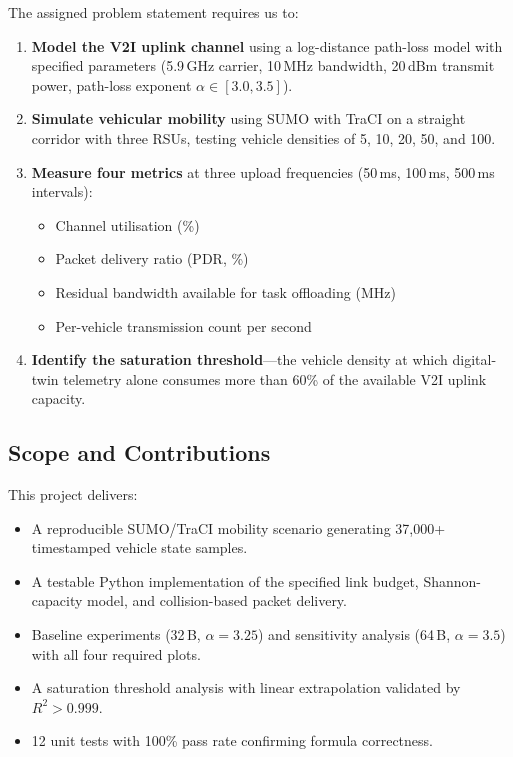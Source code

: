 \documentclass[12pt, a4paper]{article}
\begin{document}
The assigned problem statement requires us to:

\begin{enumerate}
    \item \textbf{Model the V2I uplink channel} using a log-distance path-loss
    model with specified parameters (5.9\,GHz carrier, 10\,MHz bandwidth,
    20\,dBm transmit power, path-loss exponent $\alpha \in [3.0, 3.5]$).

    \item \textbf{Simulate vehicular mobility} using SUMO with TraCI on a
    straight corridor with three RSUs, testing vehicle densities of 5, 10, 20,
    50, and 100.

    \item \textbf{Measure four metrics} at three upload frequencies
    (50\,ms, 100\,ms, 500\,ms intervals):
    \begin{itemize}
        \item Channel utilisation (\%)
        \item Packet delivery ratio (PDR, \%)
        \item Residual bandwidth available for task offloading (MHz)
        \item Per-vehicle transmission count per second
    \end{itemize}

    \item \textbf{Identify the saturation threshold}---the vehicle density at
    which digital-twin telemetry alone consumes more than 60\% of the available
    V2I uplink capacity.
\end{enumerate}

\subsection{Scope and Contributions}

This project delivers:
\begin{itemize}
    \item A reproducible SUMO/TraCI mobility scenario generating 37{,}000+
    timestamped vehicle state samples.
    \item A testable Python implementation of the specified link budget,
    Shannon-capacity model, and collision-based packet delivery.
    \item Baseline experiments (32\,B, $\alpha = 3.25$) and sensitivity
    analysis (64\,B, $\alpha = 3.5$) with all four required plots.
    \item A saturation threshold analysis with linear extrapolation validated
    by $R^2 > 0.999$.
    \item 12 unit tests with 100\% pass rate confirming formula correctness.
\end{itemize}
\end{document}

